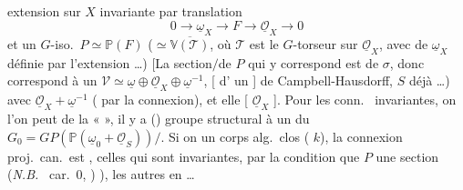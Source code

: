 \documentclass[11pt,a4paper]{article}
\begin{document}

extension sur $X$ invariante par translation
\[
0 \longrightarrow \underline{\omega}_X \longrightarrow F \longrightarrow \underline{\mathcal{O}}_X \longrightarrow 0
\]
et un $G$-iso.\ $P \simeq \mathbb{P}(F)$ ($\simeq \overline{\mathbb{V}(\mathcal{T})}$, où $\mathcal{T}$ est le $G$-torseur  sur $\underline{\mathcal{O}}_X$, avec    de $\underline{\omega}_X$ définie par l'extension …) [La  section$/$de $P$ qui y correspond est   de $\sigma$, donc correspond à un   $\mathcal{V} \simeq \underline{\omega} \oplus \underline{\mathcal{O}}_X \oplus \underline{\omega}^{-1}$,      [ d' un  \ill{} \ill{} \ill{}]     de Campbell-Hausdorff,  $S$ déjà  …) avec $\underline{\mathcal{O}}_X + \underline{\omega}^{-1}$  ( par la connexion), et elle  \struck{\uncertain{\ill{}}} \uncertain{\ill{}}    [ $\underline{\mathcal{O}}_X$ \ill{}]. Pour les conn.\  invariantes,   on     l'on peut  de la «  », il y a  (\add{\uncertain{\ill{}}})  groupe structural \struck{\ill{}}  à un  du $G_0 = GP(\mathbb{P}(\underline{\omega}_0 + \underline{\mathcal{O}}_S))/$. Si on   un corps alg.\ clos (  $k$),  la connexion proj.\ can.\ est ,  celles qui sont invariantes, par la condition \struck{\ill{}} que $P$  une section  \add{\uncertain{\ill{}} \uncertain{\ill{}}} (\emph{N.B.}\  car.~$0$, \struck{\ill{}} \add{\uncertain{\ill{}}}) \uncertain{\ill{}} ),  les autres en    …
\end{document}

